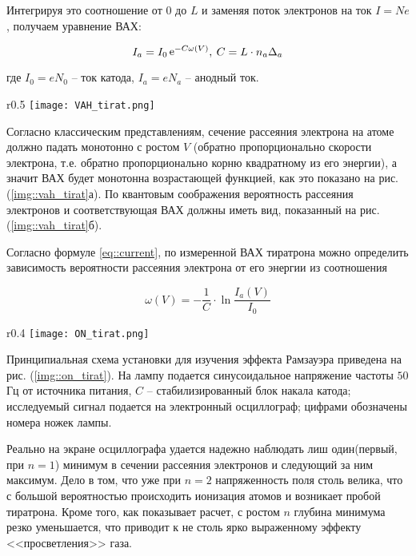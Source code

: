 Интегрируя это соотношение от $0$ до $L$ и заменяя поток электронов на ток $I =
Ne$, получаем уравнение ВАХ:

\begin{equation} \label{eq::current}
  I_a = I_0 \mathop{\mathrm e}\nolimits^{ - C \omega(V)}, \: C = L \cdot n_a \Delta_a
\end{equation}

где $I_0 = e N_0$ -- ток катода, $I_a = e N_a$ -- анодный ток.
\begin{wrapfigure}{r}{0.5\textwidth}
  \centering
  \texttt{[image: VAH\_tirat.png]}
  \caption{ {Вероятность рассeяния электрона атомом инертного газа и ВАХ
    тиратрона при классическом (а) и квантовом (б) рассмотрении.}}
  \label{img::vah_tirat}
\end{wrapfigure}
Согласно классическим представлениям, сечение рассеяния электрона на атоме
должно падать монотонно с ростом $V$ (обратно пропорционально скорости
электрона, т.е. обратно пропорционально корню квадратному из его энергии), а
значит ВАХ будет монотонна возрастающей функцией, как это показано на рис.
(\ref{img::vah_tirat}а). По квантовым соображения вероятность рассеяния
электронов и соответствующая ВАХ должны иметь вид, показанный на рис.
(\ref{img::vah_tirat}б).

Согласно формуле \eqref{eq::current}, по измеренной ВАХ тиратрона можно
определить зависимость вероятности рассеяния электрона от его энергии из
соотношения

\begin{equation}\label{eq::probability}
  \omega(V) = -\frac{1}{C} \cdot \ln \frac{I_a(V)}{I_0}
\end{equation}

\newpage
\begin{wrapfigure}{r}{0.4\textwidth}
  \centering
  \texttt{[image: ON\_tirat.png]}
  \caption{ {Схема включения тиратрона}}
  \label{img::on_tirat}
\end{wrapfigure}
Принципиальная схема установки для изучения эффекта Рамзауэра приведена на рис.
(\ref{img::on_tirat}). На лампу подается синусоидальное напряжение частоты $50$
Гц от источника питания, $C$ -- стабилизированный блок накала катода;
исследуемый сигнал подается на электронный осциллограф; цифрами обозначены
номера ножек лампы.

Реально на экране осциллографа удается надежно наблюдать лиш один(первый, при $n
= 1$) минимум в сечении рассеяния электронов и следующий за ним максимум. Дело в
том, что уже при $n = 2$ напряженность поля столь велика, что с большой
вероятностью происходить ионизация атомов и возникает пробой тиратрона. Кроме
того, как показывает расчет, с ростом $n$ глубина минимума резко уменьшается,
что приводит к не столь ярко выраженному эффекту <<просветления>> газа.

